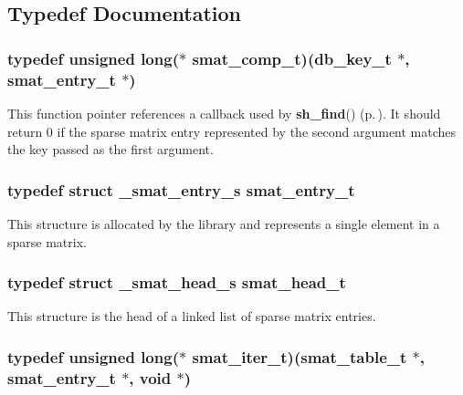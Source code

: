 \subsection{Typedef Documentation}
\subsubsection{\setlength{\rightskip}{0pt plus 5cm}typedef unsigned long($\ast$ smat\_\-comp\_\-t)({\bf db\_\-key\_\-t} $\ast$, {\bf smat\_\-entry\_\-t} $\ast$)}\label{group__dbprim__smat_a5}




 This function pointer references a callback used by {\bf sh\_\-find}() {\rm (p.\,\pageref{group__dbprim__smat_a19})}. It should return 0 if the sparse matrix entry represented by the second argument matches the key passed as the first argument. 
\subsubsection{\setlength{\rightskip}{0pt plus 5cm}typedef struct \_\-smat\_\-entry\_\-s smat\_\-entry\_\-t}\label{group__dbprim__smat_a2}




 This structure is allocated by the library and represents a single element in a sparse matrix. 
\subsubsection{\setlength{\rightskip}{0pt plus 5cm}typedef struct \_\-smat\_\-head\_\-s smat\_\-head\_\-t}\label{group__dbprim__smat_a1}




 This structure is the head of a linked list of sparse matrix entries. 
\subsubsection{\setlength{\rightskip}{0pt plus 5cm}typedef unsigned long($\ast$ smat\_\-iter\_\-t)({\bf smat\_\-table\_\-t} $\ast$, {\bf smat\_\-entry\_\-t} $\ast$, void $\ast$)}\label{group__dbprim__smat_a4}





